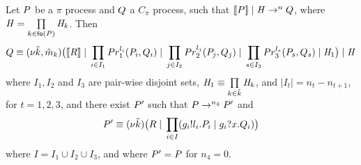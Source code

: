 \begin{lemma}\label{lem:for_soundness}
Let $P$ be a $\pi$ process and $Q$ a $C_\pi$ process, such that $\llbracket P \rrbracket \;|\; \mathit{H} \rightarrow^n Q$, where %
$\mathit{H}=\prod\limits_{k\in\mathsf{fo}(P)} \mathit{H}_{k}$. %
Then 
\[
Q\equiv (\nu \tilde{k},\tilde{m}_k)\big( \llbracket R \rrbracket \;|\; \prod\limits_{i\in I_1} Pr_1^{l_i}(P_i, Q_i) \;|\; \prod_{j\in I_2} Pr_2^{l_j}(P_j, Q_j) \;|\; \prod_{s\in I_3} Pr_3^{l_s}(P_s, Q_s) \;|\; \mathit{H}_1\big)\;|\; \mathit{H}
\]
where $I_1, I_2$ and $I_3$ are pair-wise disjoint sets, $\mathit{H}_1\equiv \prod\limits_{k\in\tilde{k}} \mathit{H}_k$, and $|I_t|=n_t-n_{t+1}$, for $t=1,2,3$, and there exist $P'$ such that $P\rightarrow^{n_4}P'$ and 
\[
P' \equiv (\nu \tilde{k})\big(R \;|\; \prod\limits_{i \in I} (g_i!l_i.P_i  \;|\; g_i?x.Q_i)\big)
\]
where $I=I_1\cup I_2\cup I_3$, and where $P'=P$ for $n_4=0$.
\end{lemma}
%
